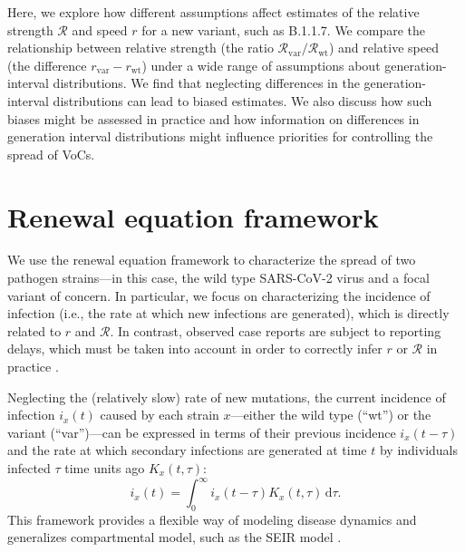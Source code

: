 \documentclass[12pt]{article}
\newcommand{\vvvar}{\mathrm{var}}
\newcommand{\wwwt}{\mathrm{wt}}
\newcommand{\rx}[1]{\ensuremath{{r}_{#1}}\xspace}
\newcommand{\rw}{\rx{\wwwt}}
\newcommand{\rv}{\rx{\vvvar}}
\newcommand{\Rx}[1]{\ensuremath{{\mathcal R}_{#1}}\xspace}
\newcommand{\RR}{\ensuremath{{\mathcal R}}\xspace}
\newcommand{\Rw}{\Rx{\wwwt}}
\newcommand{\Rv}{\Rx{\vvvar}}
\newcommand{\dd}[1]{\ensuremath{\, \mathrm{d}#1}}
\newcommand{\dtau}{\dd{\tau}}
\begin{document}
Here, we explore how different assumptions affect estimates of the relative strength $\RR$ and speed $r$ for a new variant, such as B.1.1.7.
We compare the relationship between relative strength (the ratio $\Rv/\Rw$) and relative speed (the difference $\rv-\rw$) under a wide range of assumptions about generation-interval distributions.
We find that neglecting differences in the generation-interval distributions can lead to biased estimates.
We also discuss how such biases might be assessed in practice and how information on differences in generation interval distributions might influence priorities for controlling the spread of VoCs.

\section{Renewal equation framework}

We use the renewal equation framework to characterize the spread of two pathogen strains---in this case, the wild type SARS-CoV-2 virus and a focal variant of concern.
In particular, we focus on characterizing the incidence of infection (i.e., the rate at which new infections are generated), which is directly related to $r$ and $\RR$.
In contrast, observed case reports are subject to reporting delays, which must be taken into account in order to correctly infer $r$ or $\RR$ in practice \citep{goldstein2009reconstructing,gostic2020practical}.

Neglecting the (relatively slow) rate of new mutations, the current incidence of infection $i_x(t)$ caused by each strain $x$---either the wild type (``wt'') or the variant (``var'')---can be expressed in terms of their previous incidence $i_x(t-\tau)$ and the rate at which secondary infections are generated at time $t$ by individuals infected $\tau$ time units ago $K_x(t, \tau)$:
\begin{equation}
i_x(t) = \int_0^\infty i_x(t-\tau) K_x(t, \tau) \dtau.
\end{equation}
This framework provides a flexible way of modeling disease dynamics and generalizes compartmental model, such as the SEIR model \citep{heesterbeek1996concept, diekmann2000mathematical, roberts2004modelling, aldis2005integral, roberts2007model, champredon2018equivalence}.
\end{document}
